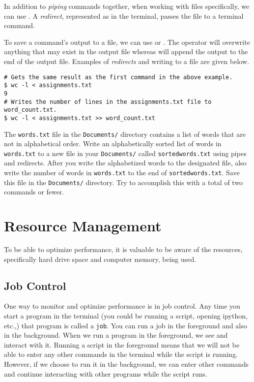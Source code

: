 In addition to \emph{piping} commands together, when working with files specifically, we can use . 
A \emph{redirect}, represented as \li{<} in the terminal, passes the file to a terminal command.

To save a command's output to a file, we can use \li{>} or \li{>>}. 
The \li{>} operator will overwrite anything that may exist in the output file whereas \li{>>} will append the output to the end of the output file. 
Examples of \emph{redirects} and writing to a file are given below.

\begin{lstlisting}
# Gets the same result as the first command in the above example.
$ wc -l < assignments.txt
9
# Writes the number of lines in the assignments.txt file to word_count.txt.
$ wc -l < assignments.txt >> word_count.txt 
\end{lstlisting}

\begin{problem}
The \texttt{words.txt} file in the \texttt{Documents/} directory contains a list of words that are not in alphabetical order.
Write an alphabetically sorted list of words in \texttt{words.txt} to a new file in your \texttt{Documents/} called \texttt{sortedwords.txt} using pipes and redirects. 
After you write the alphabetized words to the designated file, also write the number of words in \texttt{words.txt} to the end of \texttt{sortedwords.txt}. 
Save this file in the \texttt{Documents/} directory. Try to accomplish this with a total of two commands or fewer.
\end{problem}


\section*{Resource Management} %

To be able to optimize performance, it is valuable to be aware of the resources, specifically hard drive space and computer memory, being used.

\subsection*{Job Control} %

One way to monitor and optimize performance is in job control. 
Any time you start a program in the terminal (you could be running a script, opening ipython, etc.,) that program is called a \texttt{job}.
You can run a job in the foreground and also in the background. When we run a program in the foreground, we see and interact with it. 
Running a script in the foreground means that we will not be able to enter any other commands in the terminal while the script is running. 
However, if we choose to run it in the background, we can enter other commands and continue interacting with other programs while the script runs.

